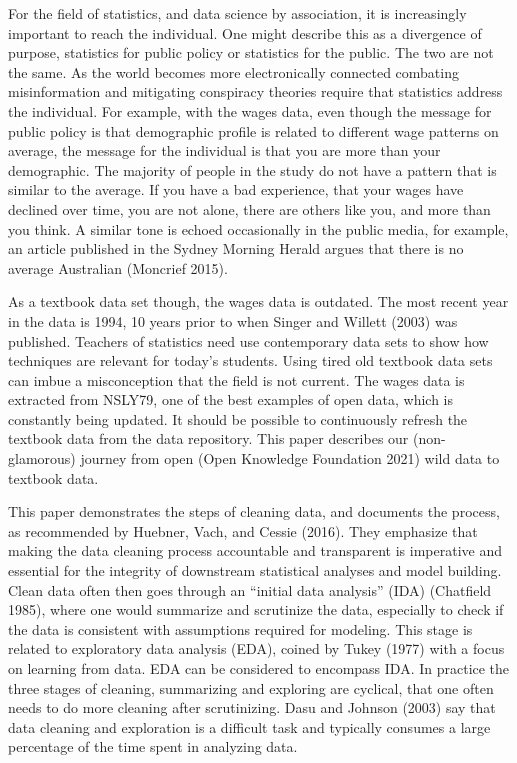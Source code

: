 \documentclass{article}
\begin{document}
For the field of statistics, and data science by association, it is increasingly important to reach the individual. One might describe this as a divergence of purpose, statistics for public policy or statistics for the public. The two are not the same. As the world becomes more electronically connected combating misinformation and mitigating conspiracy theories require that statistics address the individual. For example, with the wages data, even though the message for public policy is that demographic profile is related to different wage patterns on average, the message for the individual is that you are more than your demographic. The majority of people in the study do not have a pattern that is similar to the average. If you have a bad experience, that your wages have declined over time, you are not alone, there are others like you, and more than you think. A similar tone is echoed occasionally in the public media, for example, an article published in the Sydney Morning Herald argues that there is no average Australian (Moncrief 2015).

As a textbook data set though, the wages data is outdated. The most recent year in the data is 1994, 10 years prior to when Singer and Willett (2003) was published. Teachers of statistics need use contemporary data sets to show how techniques are relevant for today's students. Using tired old textbook data sets can imbue a misconception that the field is not current. The wages data is extracted from NSLY79, one of the best examples of open data, which is constantly being updated. It should be possible to continuously refresh the textbook data from the data repository. This paper describes our (non-glamorous) journey from open (Open Knowledge Foundation 2021) wild data to textbook data.

This paper demonstrates the steps of cleaning data, and documents the process, as recommended by Huebner, Vach, and Cessie (2016). They emphasize that making the data cleaning process accountable and transparent is imperative and essential for the integrity of downstream statistical analyses and model building. Clean data often then goes through an ``initial data analysis'' (IDA) (Chatfield 1985), where one would summarize and scrutinize the data, especially to check if the data is consistent with assumptions required for modeling. This stage is related to exploratory data analysis (EDA), coined by Tukey (1977) with a focus on learning from data. EDA can be considered to encompass IDA. In practice the three stages of cleaning, summarizing and exploring are cyclical, that one often needs to do more cleaning after scrutinizing. Dasu and Johnson (2003) say that data cleaning and exploration is a difficult task and typically consumes a large percentage of the time spent in analyzing data.
\end{document}

